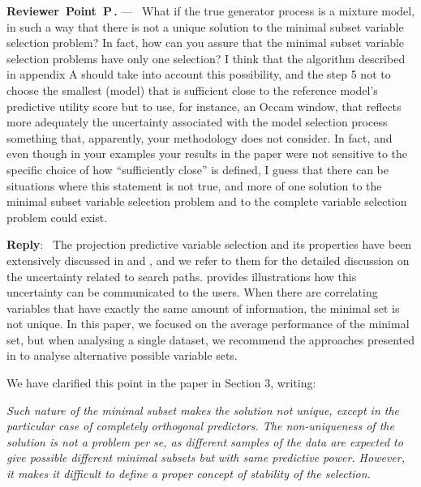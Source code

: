 \documentclass[11pt]{article}
\newcounter{reviewer}
\newcounter{point}[reviewer]
\renewcommand{\thepoint}{P\,\thereviewer.\arabic{point}}
\newenvironment{point}
   {\refstepcounter{point} \bigskip \noindent \begin{sf}{\textbf{Reviewer~Point~\thepoint} } ---\ }
   {\par \end{sf}}
\newenvironment{reply}
   {\medskip \noindent \textbf{Reply}:\  }
   {\medskip}
\begin{document}
\begin{point}
What if the true generator process is a mixture model, in such a way that there is not a unique solution to the minimal subset variable selection problem? In fact, how can you assure that the minimal subset variable selection problems have only one selection? I think that the algorithm described in appendix A should take into account this possibility, and the step 5 not to choose the smallest (model) that is sufficient close to the reference model's predictive utility score but to use, for instance, an Occam window, that reflects more adequately the uncertainty associated with the model selection process something that, apparently, your methodology does not consider. In fact, and even though in your examples your results in the paper were not sensitive to the specific choice of how “sufficiently close” is defined, I guess that there can be situations where this statement is not true, and more of one solution to the minimal subset variable selection problem and to the complete variable selection problem could exist.
\end{point}

\begin{reply}
The projection predictive variable selection and its properties have been extensively discussed in \citet{piironen2017comparison} and \citet{paper:projpred}, and we refer to them for the detailed discussion on the uncertainty related to search paths. \citet{paasiniemi2018} provides illustrations how this uncertainty can be communicated to the users. When there are correlating variables that have exactly the same amount of information, the minimal set is not unique. In this paper, we focused on the average performance of the minimal set, but when analysing a single dataset, we recommend the approaches presented in \citet{paasiniemi2018} to analyse alternative possible variable sets.

We have clarified this point in the paper in Section 3, writing:

\vspace{0.5\baselineskip}

\textit{Such nature of the minimal subset makes the solution
	not unique, except in the particular case of completely orthogonal predictors. 
	The non-uniqueness of the solution is not a problem per se, as different samples of the data
	are expected to give possible different minimal subsets but with same predictive power. 
	However, it makes it difficult to define a proper
	concept of stability of the selection.}
\end{reply}
\end{document}
